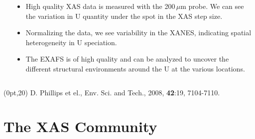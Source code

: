 \documentclass[10pt, xcolor=x11names, compress, handout]{beamer}
\begin{document}
\begin{frame}
\begin{columns}[T]
\begin{column}{0.34\linewidth}
    \end{column}
    \begin{column}{0.66\linewidth}
      \begin{itemize}[<+->]
      \item High quality XAS data is measured with the 200\,$\mu$m
        probe.  We can see the variation in U quantity under the spot
        in the XAS step size.\\[5ex]
      \item Normalizing the data, we see variability in the XANES,
        indicating spatial heterogeneity in U speciation.\\[5ex]
      \item The EXAFS is of high quality and can be analyzed to
        uncover the different structural environments around the U at
        the various locations.
      \end{itemize}
    \end{column}
  \end{columns}
  \begin{textblock*}{0.5\linewidth}(0pt,20\TPVertModule)
    \tiny D. Phillips et el., Env. Sci. and Tech., 2008,
    \textbf{42}:19, 7104-7110.
  \end{textblock*}
\end{frame}


\section[XAS Community]{The XAS Community}
\end{document}
